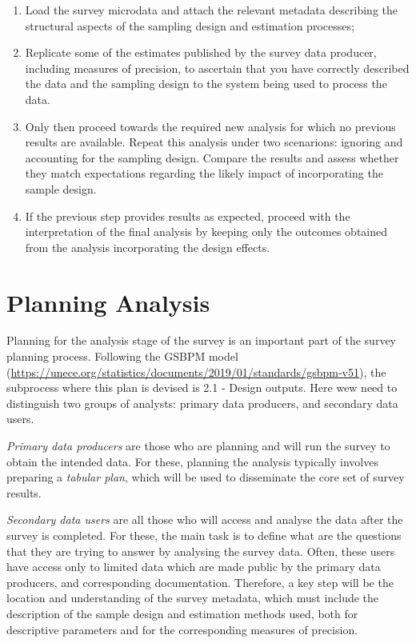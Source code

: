 \documentclass[
  12pt,
]{book}
\begin{document}
\begin{enumerate}
\def\labelenumi{\arabic{enumi}.}
\item
  Load the survey microdata and attach the relevant metadata describing the structural aspects of the sampling design and estimation processes;
\item
  Replicate some of the estimates published by the survey data producer, including measures of precision, to ascertain that you have correctly described the data and the sampling design to the system being used to process the data.
\item
  Only then proceed towards the required new analysis for which no previous results are available. Repeat this analysis under two scenarions: ignoring and accounting for the sampling design. Compare the results and assess whether they match expectations regarding the likely impact of incorporating the sample design.
\item
  If the previous step provides results as expected, proceed with the interpretation of the final analysis by keeping only the outcomes obtained from the analysis incorporating the design effects.
\end{enumerate}

\chapter{Planning Analysis}\label{planning-analysis-1}

Planning for the analysis stage of the survey is an important part of the survey planning process. Following the GSBPM model (\url{https://unece.org/statistics/documents/2019/01/standards/gsbpm-v51}), the subprocess where this plan is devised is 2.1 - Design outputs. Here wew need to distinguish two groups of analysts: primary data producers, and secondary data users.

\emph{Primary data producers} are those who are planning and will run the survey to obtain the intended data. For these, planning the analysis typically involves preparing a \emph{tabular plan}, which will be used to disseminate the core set of survey results.

\emph{Secondary data users} are all those who will access and analyse the data after the survey is completed. For these, the main task is to define what are the questions that they are trying to answer by analysing the survey data. Often, these users have access only to limited data which are made public by the primary data producers, and corresponding documentation. Therefore, a key step will be the location and understanding of the survey metadata, which must include the description of the sample design and estimation methods used, both for descriptive parameters and for the corresponding measures of precision.
\end{document}
